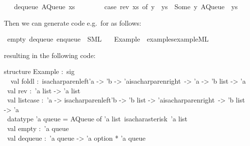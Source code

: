 \begin{isabellebody}
\ \ {\isacharbar}\ {\isachardoublequoteopen}dequeue\ {\isacharparenleft}AQueue\ xs\ {\isacharbrackleft}{\isacharbrackright}{\isacharparenright}\ {\isacharequal}\isanewline
\ \ \ \ \ \ {\isacharparenleft}case\ rev\ xs\ of\ y\ {\isacharhash}\ ys\ {\isasymRightarrow}\ {\isacharparenleft}Some\ y{\isacharcomma}\ AQueue\ {\isacharbrackleft}{\isacharbrackright}\ ys{\isacharparenright}{\isacharparenright}{\isachardoublequoteclose}%
\endisatagquote
{\isafoldquote}%
%
\isadelimquote
%
\endisadelimquote
%
\begin{isamarkuptext}%
\noindent Then we can generate code e.g.~for  as follows:%
\end{isamarkuptext}%
\isamarkuptrue%
%
\isadelimquote
%
\endisadelimquote
%
\isatagquote
{}\isamarkupfalse%
\ empty\ dequeue\ enqueue\ \ SML\isanewline
\ \ \ Example\ \ {\isachardoublequoteopen}examples{\isacharslash}example{\isachardot}ML{\isachardoublequoteclose}%
\endisatagquote
{\isafoldquote}%
%
\isadelimquote
%
\endisadelimquote
%
\begin{isamarkuptext}%
\noindent resulting in the following code:%
\end{isamarkuptext}%
\isamarkuptrue%
%
\isadelimquote
%
\endisadelimquote
%
\isatagquote
%
\begin{isamarkuptext}%
\isatypewriter%
\noindent%
\hspace*{0pt}structure Example :~sig\\
\hspace*{0pt}{\char92}~{}~val foldl :~{}{}isacharparenleft{}'a -> 'b -> 'a{}{}isacharparenright{}~-> 'a -> 'b list -> 'a\\
\hspace*{0pt} ~val rev :~'a list -> 'a list\\
\hspace*{0pt} ~val list{}case :~'a -> {}{}isacharparenleft{}'b -> 'b list -> 'a{}{}isacharparenright{}~-> 'b list -> 'a\\
\hspace*{0pt} ~datatype 'a queue = AQueue of 'a list{}~{}{}isacharasterisk{}~'a list\\
\hspace*{0pt} ~val empty :~'a queue\\
\hspace*{0pt} ~val dequeue :~'a queue -> 'a option * 'a queue\\

\end{isamarkuptext}
\end{isabellebody}
